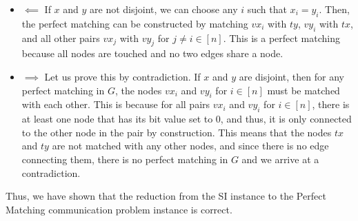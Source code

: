 \documentclass{article}
\begin{document}
\begin{itemize}
    \item $\impliedby$ If $x$ and $y$ are not disjoint, we can choose any $i$ such that $x_i = y_i$. Then, the perfect matching can be constructed by matching $vx_i$ with $ty$, $vy_i$ with $tx$, and all other pairs $vx_j$ with $vy_j$ for $j \neq i \in [n]$. This is a perfect matching because all nodes are touched and no two edges share a node.
    \item $\implies$ Let us prove this by contradiction. If $x$ and $y$ are disjoint, then for any perfect matching in $G$, the nodes $vx_i$ and $vy_i$ for $i \in [n]$ must be matched with each other. This is because for all pairs $vx_i$ and $vy_i$ for $i \in [n]$, there is at least one node that has its bit value set to $0$, and thus, it is only connected to the other node in the pair by construction. This means that the nodes $tx$ and $ty$ are not matched with any other nodes, and since there is no edge connecting them, there is no perfect matching in $G$ and we arrive at a contradiction.
\end{itemize}

Thus, we have shown that the reduction from the SI instance to the Perfect Matching communication problem instance is correct.
\end{document}
